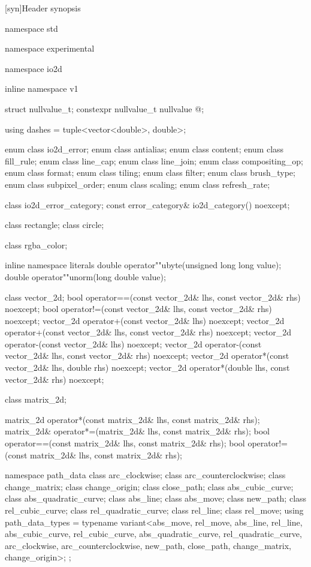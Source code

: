 [syn]{Header  synopsis}

%
\begin{codeblock}

namespace std { namespace experimental {
  namespace io2d { inline namespace v1 {

  struct nullvalue_t;
  constexpr nullvalue_t nullvalue{ @\impdef@ };

  using dashes = tuple<vector<double>, double>;

  enum class io2d_error;
  enum class antialias;
  enum class content;
  enum class fill_rule;
  enum class line_cap;
  enum class line_join;
  enum class compositing_op;
  enum class format;
  enum class tiling;
  enum class filter;
  enum class brush_type;
  enum class subpixel_order;
  enum class scaling;
  enum class refresh_rate;

  class io2d_error_category;
  const error_category& io2d_category() noexcept;

  class rectangle;
  class circle;

  class rgba_color;

  inline namespace literals {
    double operator""ubyte(unsigned long long value);
    double operator""unorm(long double value);
  }
  
  class vector_2d;
  bool operator==(const vector_2d& lhs, const vector_2d& rhs) noexcept;
  bool operator!=(const vector_2d& lhs, const vector_2d& rhs) noexcept;
  vector_2d operator+(const vector_2d& lhs) noexcept;
  vector_2d operator+(const vector_2d& lhs, const vector_2d& rhs) noexcept;
  vector_2d operator-(const vector_2d& lhs) noexcept;
  vector_2d operator-(const vector_2d& lhs, const vector_2d& rhs) noexcept;
  vector_2d operator*(const vector_2d& lhs, double rhs) noexcept;
  vector_2d operator*(double lhs, const vector_2d& rhs) noexcept;

  class matrix_2d;

  matrix_2d operator*(const matrix_2d& lhs, const matrix_2d& rhs);
  matrix_2d& operator*=(matrix_2d& lhs, const matrix_2d& rhs);
  bool operator==(const matrix_2d& lhs, const matrix_2d& rhs);
  bool operator!=(const matrix_2d& lhs, const matrix_2d& rhs);

  namespace path_data {
    class arc_clockwise;
    class arc_counterclockwise;
    class change_matrix;
    class change_origin;
    class close_path;
    class abs_cubic_curve;
    class abs_quadratic_curve;
    class abs_line;
    class abs_move;
    class new_path;
    class rel_cubic_curve;
    class rel_quadratic_curve;
    class rel_line;
    class rel_move;
    using path_data_types = typename variant<abs_move, rel_move,
      abs_line, rel_line, abs_cubic_curve, rel_cubic_curve, 
      abs_quadratic_curve, rel_quadratic_curve, arc_clockwise, 
      arc_counterclockwise, new_path, close_path, change_matrix, change_origin>;
  };
  
}}}}
\end{codeblock}
